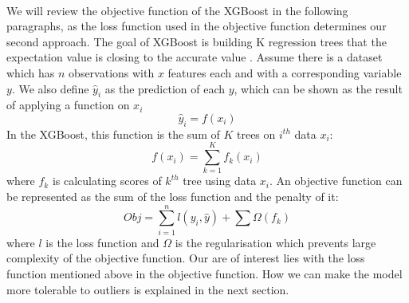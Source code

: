 \documentclass[runningheads]{llncs}
\begin{document}
\paragraph{} We will review the objective function of the XGBoost in the following paragraphs, as the loss function used in the objective function determines our second approach. The goal of XGBoost is building K regression trees that the expectation value is closing to the accurate value \citep{chen2016xgboost}. Assume there is a dataset which has $n$ observations with $x$ features each and with a corresponding variable $y$. We also define $\hat{y}_i$ as the prediction of each $y$, which can be shown as the result of applying a function on $x_i$
\begin{equation}
    \hat{y}_i = f(x_i)
\end{equation}
In the XGBoost, this function is the sum of $K$ trees on $i^{th}$ data $x_i$:
\begin{equation}
    f(x_i) = \sum^K_{k=1} f_k(x_i)
\end{equation}
where $f_k$ is calculating scores of $k^{th}$ tree using data $x_i$. An objective function can be represented as the sum of the loss function and the penalty of it:
\begin{equation}
    Obj = \sum^n_{i=1}l(y_i, \hat{y}) + \sum \Omega(f_k)
\end{equation}
where $l$ is the loss function and $\Omega$ is the regularisation which prevents large complexity of the objective function. Our are of interest lies with the loss function mentioned above in the objective function. How we can make the model more tolerable to outliers is explained in the next section.
\end{document}
